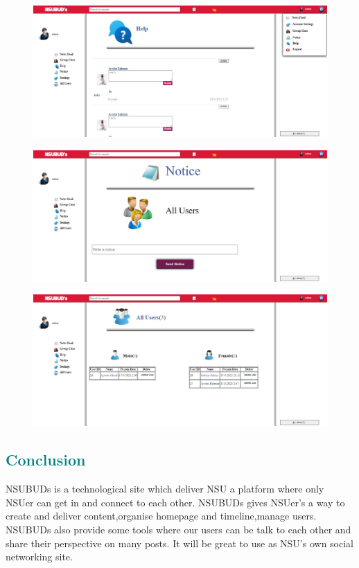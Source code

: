 {{\begin{figure}[ht]
\label{fig:graph}
\end{figure}
\begin{figure}[ht]
\includegraphics[width=18cm]{images/admin3.png}
\label{fig:graph}
\end{figure}
\newpage
\begin{figure}[ht]
\includegraphics[width=18cm]{images/admin4.png}
\label{fig:graph}
\end{figure}
\begin{figure}[ht]
\includegraphics[width=18cm]{images/admin5.png}
\label{fig:graph}
\end{figure}
\newpage
{\textcolor{teal}{\section{ Conclusion}}
NSUBUDs is a technological site which deliver NSU a platform where only NSUer can get in and connect to each other. NSUBUDs gives NSUer’s a way to create and deliver content,organise homepage and timeline,manage users. NSUBUDs also provide some tools where our users can be talk to each other and share their perspective on many posts. It will be great to use as NSU's own social networking site.\\
}}}
